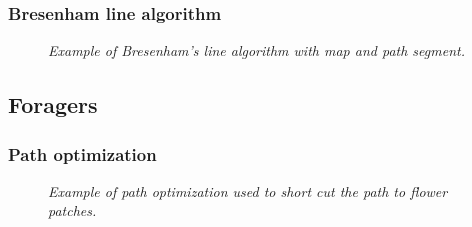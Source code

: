 	\subsubsection{Bresenham line algorithm}
		\begin{figure}\label{fig:bresenham}
			\centering
			\caption{\textit{Example of Bresenham's line algorithm with map and path segment.}}
		\end{figure}
\subsection{Foragers}
	\subsubsection{Path optimization}
		\begin{figure}\label{pathOptimization}
			\centering
			\caption{\textit{Example of path optimization used to short cut the path to flower patches.}}
		\end{figure}